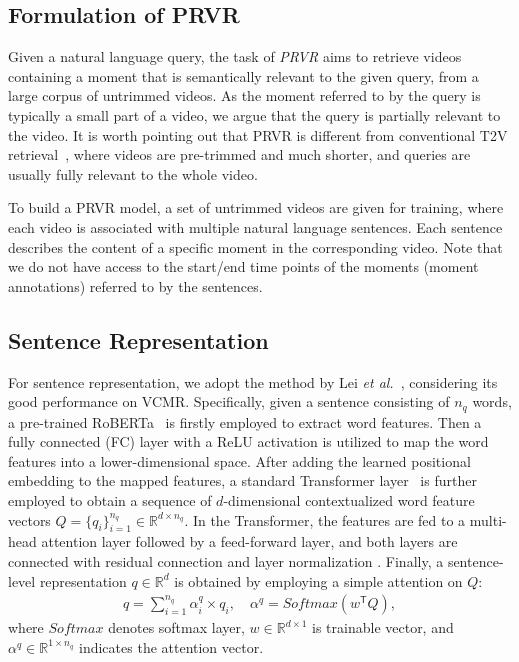 \documentclass[sigconf]{acmart}
\newcommand{\etal}{\emph{et al.}~}
\begin{document}
\subsection{Formulation of PRVR}

Given a natural language query, the task of \textit{PRVR} aims to retrieve videos containing a moment that is semantically relevant to the given query, from a large corpus of untrimmed videos.
As the moment referred to by the query is typically a small part of a video, we argue that the query is partially relevant to the video.
It is worth pointing out that PRVR is different from conventional T2V retrieval~\cite{dong2019dual,chen2020fine,han2021fine}, where videos are pre-trimmed and much shorter, and queries are usually fully relevant to the whole video.

To build a PRVR model, a set of untrimmed videos are given for training, where each video is associated with multiple natural language sentences. Each sentence describes the content of a specific moment in the corresponding video. Note that we do not have access to the start/end time points of the moments (moment annotations) referred to by the sentences.

\subsection{Sentence Representation} \label{ssec:sent-rep}


For sentence representation, we adopt the method by Lei \etal \cite{lei2020tvr}, considering its good performance on VCMR.
Specifically, given a sentence consisting of $n_q$ words, a pre-trained RoBERTa~\cite{liu2019roberta} is firstly employed to extract word features.
Then a fully connected (FC) layer with a ReLU activation is utilized to map the word features into a lower-dimensional space.
After adding the learned positional embedding to the mapped features, a standard Transformer layer~\cite{vaswani2017attention} is further employed to obtain a sequence of $d$-dimensional contextualized word feature vectors $Q=\{q_i\}_{i=1}^{n_q}\in\mathbb{R}^{{d}\times{n_q}}$. 
In the Transformer, the features are fed to a multi-head attention layer followed by a feed-forward layer, and both layers are connected with residual connection \cite{he2016deep} and layer normalization \cite{ba2016layer}.
Finally, a sentence-level representation $q\in\mathbb{R}^{d}$ is obtained by employing a simple attention on $Q$:
\begin{equation}\label{eq:att}
\begin{aligned}
    q=\sum_{i=1}^{n_q} {\alpha_{i}^{q}}\times{q_{i}}, \quad
    \alpha^q=Softmax(w^\mathsf{T}  {Q} ),
\end{aligned}
\end{equation}
where $Softmax$ denotes softmax layer, $w\in\mathbb{R}^{d\times{1}}$ is trainable vector, and $\alpha^q \in\mathbb{R}^{{1 \times n_q} } $ indicates the attention vector.
\end{document}

